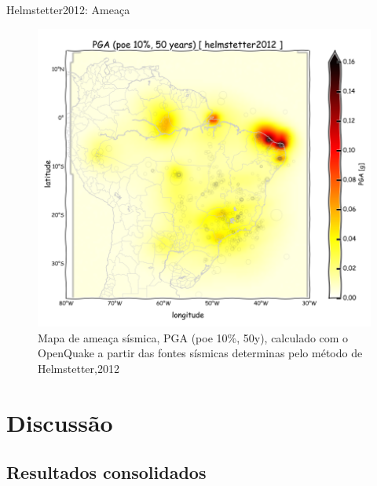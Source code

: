 \documentclass[ucs,8pt]{beamer}
\begin{document}
\begin{frame}{Helmstetter2012: Ameaça}
\begin{figure}[H]
  \centering
  \includegraphics[height=.93\textheight]{pga_helmstetter} 
  \caption{Mapa de ameaça sísmica, PGA (poe 10\%, 50y), 
  		   calculado com o OpenQuake a partir das fontes sísmicas
  		   determinas pelo método de Helmstetter,2012 }
  \label{fig:helm_h} 
\end{figure}
\end{frame}




\section{Discussão}
\subsection{Resultados consolidados}
\end{document}
